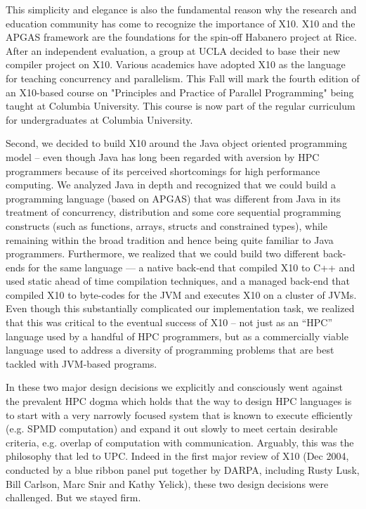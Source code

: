 This simplicity and elegance is also the fundamental reason why the
research and education community has come to recognize the importance
of X10. X10 and the APGAS framework are the foundations for the
spin-off Habanero project at Rice. After an independent evaluation, a
group at UCLA decided to base their new compiler project on X10.
Various academics have adopted X10 as the language for teaching
concurrency and parallelism. This Fall  will mark the fourth edition
of an X10-based course on "Principles and Practice of Parallel
Programming" being taught at Columbia University. This course is now
part of the regular curriculum for undergraduates at Columbia University. 

Second, we decided to build X10 around the Java object oriented
programming model -- even though Java has long been regarded with
aversion by HPC programmers because of its perceived shortcomings for
high performance computing.  We analyzed Java in depth and recognized
that we could build a  programming language (based on APGAS) that was
different from Java in its treatment of concurrency, distribution and
some core sequential programming constructs (such as functions,
arrays, structs and constrained types), while remaining within the
broad tradition and hence being quite familiar to Java programmers.
Furthermore, we realized that we could build two different back-ends
for the same language --- a native back-end that compiled X10 to C++
and used static ahead of time compilation techniques, and a managed
back-end that compiled X10 to byte-codes for the JVM and executes X10
on a cluster of JVMs. Even though this substantially complicated our
implementation task, we realized that this was critical to the
eventual success of X10 -- not just as an ``HPC'' language used by a
handful of HPC programmers, but as a commercially viable language used
to address a diversity of programming problems that are best tackled
with JVM-based programs.  

In these two major design decisions we explicitly and consciously went
against the prevalent HPC dogma which holds that the way to design HPC
languages is to start with a very narrowly focused system that is
known to execute efficiently (e.g. SPMD computation) and expand it out
slowly to meet certain desirable criteria, e.g. overlap of computation
with communication. Arguably, this was the philosophy that led to UPC.
Indeed in the first major review of X10 (Dec 2004, conducted by a blue
ribbon panel put together by DARPA, including Rusty Lusk, Bill
Carlson, Marc Snir and Kathy Yelick), these two design decisions were
challenged. But we stayed firm. 

